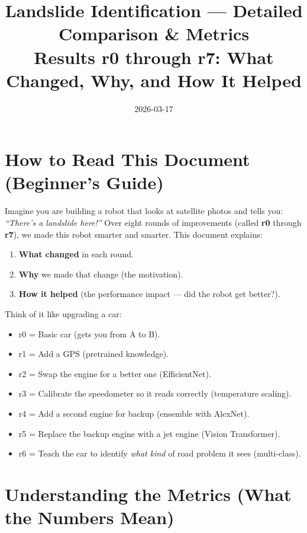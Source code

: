 \documentclass[11pt]{article}
\title{Landslide Identification — Detailed Comparison \& Metrics\\[0.3em]
\large Results r0 through r7: What Changed, Why, and How It Helped}
\author{}
\date{2026-03-17}
\begin{document}
\maketitle
\tableofcontents
\newpage

\section{How to Read This Document (Beginner's Guide)}

Imagine you are building a robot that looks at satellite photos and tells you: \textit{``There's a landslide here!''} Over eight rounds of improvements (called \textbf{r0} through \textbf{r7}), we made this robot smarter and smarter. This document explains:

\begin{enumerate}[nosep]
    \item \textbf{What changed} in each round.
    \item \textbf{Why} we made that change (the motivation).
    \item \textbf{How it helped} (the performance impact --- did the robot get better?).
\end{enumerate}

\noindent Think of it like upgrading a car:
\begin{itemize}[nosep]
    \item r0 = Basic car (gets you from A to B).
    \item r1 = Add a GPS (pretrained knowledge).
    \item r2 = Swap the engine for a better one (EfficientNet).
    \item r3 = Calibrate the speedometer so it reads correctly (temperature scaling).
    \item r4 = Add a second engine for backup (ensemble with AlexNet).
    \item r5 = Replace the backup engine with a jet engine (Vision Transformer).
    \item r6 = Teach the car to identify \emph{what kind} of road problem it sees (multi-class).
\end{itemize}

\section{Understanding the Metrics (What the Numbers Mean)}
\end{document}
